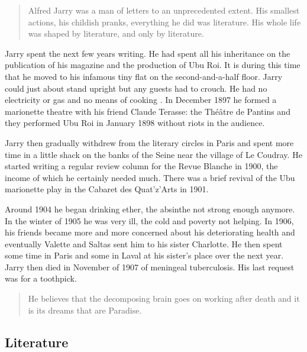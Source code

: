\begin{quotation}
  Alfred Jarry was a man of letters to an unprecedented extent. His smallest actions, his childish pranks, everything he did was literature. His whole life was shaped by literature, and only by literature. 
\end{quotation}

Jarry spent the next few years writing. He had spent all his inheritance on the publication of his magazine and the production of Ubu Roi. It is during this time that he moved to his infamous tiny flat on the second-and-a-half floor. Jarry could just about stand upright but any guests had to crouch. He had no electricity or gas and no means of cooking \autocite[p.195]{Brotchie2011a}. In December 1897 he formed a marionette theatre with his friend Claude Terasse: the Théâtre de Pantins and they performed Ubu Roi in January 1898 without riots in the audience.

Jarry then gradually withdrew from the literary circles in Paris and spent more time in a little shack on the banks of the Seine near the village of Le Coudray. He started writing a regular review column for the Revue Blanche in 1900, the income of which he certainly needed much. There was a brief revival of the Ubu marionette play in the Cabaret des Quat'z'Arts in 1901.

Around 1904 he began drinking ether, the absinthe not strong enough anymore. In the winter of 1905 he was very ill, the cold and poverty not helping. In 1906, his friends became more and more concerned about his deteriorating health and eventually Valette and Saltas sent him to his sister Charlotte. He then spent some time in Paris and some in Laval at his sister's place over the next year. Jarry then died in November of 1907 of meningeal tuberculosis. His last request was for a toothpick.

\begin{quotation}
  He believes that the decomposing brain goes on working after death and it is its dreams that are Paradise. 
\end{quotation}


\subsection{Literature}

